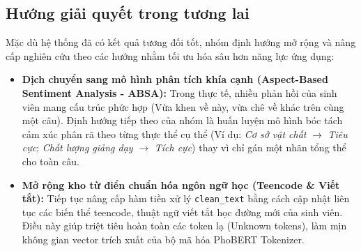 \documentclass[conference,10pt,a4paper]{IEEEtran}
\begin{document}
\subsection{Hướng giải quyết trong tương lai}
\noindent Mặc dù hệ thống đã có kết quả tương đối tốt, nhóm định hướng mở rộng và nâng cấp nghiên cứu theo các hướng nhằm tối ưu hóa sâu hơn năng lực ứng dụng:
\begin{itemize}
    \item \textbf{Dịch chuyển sang mô hình phân tích khía cạnh (Aspect-Based Sentiment Analysis - ABSA):} Trong thực tế, nhiều phản hồi của sinh viên mang cấu trúc phức hợp (Vừa khen về này, vừa chê về khác trên cùng một câu). Định hướng tiếp theo của nhóm là huấn luyện mô hình bóc tách cảm xúc phân rã theo từng thực thể cụ thể (Ví dụ: \textit{Cơ sở vật chất} $\rightarrow$ \textit{Tiêu cực}; \textit{Chất lượng giảng dạy} $\rightarrow$ \textit{Tích cực}) thay vì chỉ gán một nhãn tổng thể cho toàn câu.
    
    \item \textbf{Mở rộng kho từ điển chuẩn hóa ngôn ngữ học (Teencode \& Viết tắt):} Tiếp tục nâng cấp hàm tiền xử lý \texttt{clean\_text} bằng cách cập nhật liên tục các biến thể teencode, thuật ngữ viết tắt học đường mới của sinh viên. Điều này giúp triệt tiêu hoàn toàn các token lạ (Unknown tokens), làm mịn không gian vector trích xuất của bộ mã hóa PhoBERT Tokenizer.
\end{itemize}

\clearpage 

\balance 
\end{document}
